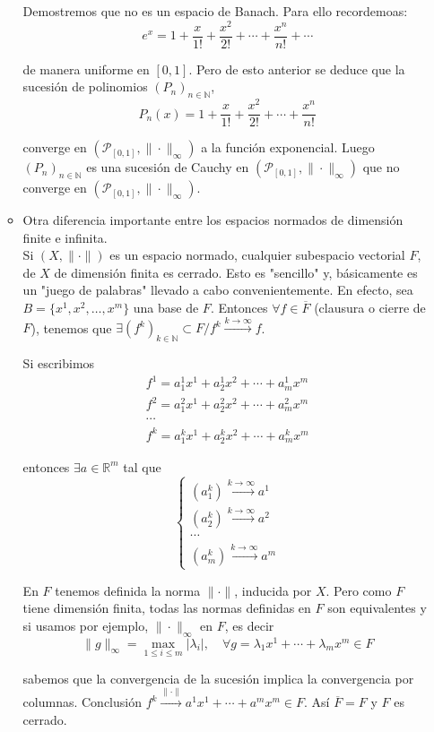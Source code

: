 \documentclass{article}
\begin{document}
\begin{enumerate}
\begin{itemize}
Demostremos que no es un espacio de Banach. Para ello recordemoas:
\begin{equation*}
e^x=1+\frac{x}{1!}+\frac{x^2}{2!}+\cdots+\frac{x^n}{n!}+\cdots
\end{equation*}

de manera uniforme en $[0,1]$. Pero de esto anterior se deduce que la sucesión de polinomios $(P_n)_{n\in\mathbb{N}}$,
\begin{equation*}
P_n(x)=1+\frac{x}{1!}+\frac{x^2}{2!}+\cdots+\frac{x^n}{n!}
\end{equation*}

converge en $(\mathcal{P}_{[0,1]},\|\cdot\|_\infty)$ a la función exponencial. Luego $(P_n)_{n\in\mathbb{N}}$ es una sucesión de Cauchy en $(\mathcal{P}_{[0,1]},\|\cdot\|_\infty)$ que no converge en $(\mathcal{P}_{[0,1]},\|\cdot\|_\infty)$.

\item Otra diferencia importante entre los espacios normados de dimensión finite e infinita.\\

Si $(X,\|\cdot\|)$ es un espacio normado, cualquier subespacio vectorial $F$, de $X$ de dimensión finita es cerrado. Esto es "sencillo" y, básicamente es un "juego de palabras" llevado a cabo convenientemente. En efecto, sea $B=\{x^1,x^2,\ldots,x^m\}$ una base de $F$. Entonces $\forall f\in \overline{F}$ (clausura o cierre de $F$), tenemos que $\exists (f^k)_{k\in\mathbb{N}}\subset F/f^k\xrightarrow{k\to\infty}f$.

Si escribimos
\begin{gather*}
f^1=a_1^1x^1+a_2^1x^2+\cdots+a^1_mx^m\\
f^2=a_1^2x^1+a_2^2x^2+\cdots+a^2_mx^m\\
\cdots\\
f^k=a_1^kx^1+a_2^kx^2+\cdots +a_m^kx^m
\end{gather*}

entonces $\exists a\in \mathbb{R}^m$ tal que
\begin{equation*}
\left\lbrace\begin{array}{c}
(a_1^k)\xrightarrow{k\to\infty} a^1\\
(a_2^k)\xrightarrow{k\to\infty} a^2\\
\cdots\\
(a^k_m)\xrightarrow{k\to\infty}a^m
\end{array}\right.
\end{equation*}

En $F$ tenemos definida la norma $\|\cdot\|$, inducida por $X$. Pero como $F$ tiene dimensión finita, todas las normas definidas en $F$ son equivalentes y si usamos por ejemplo, $\|\cdot\|_\infty$ en $F$, es decir
\begin{equation*}
\|g\|_{\infty}=\max_{1\leq i\leq m}|\lambda_i|,\quad \forall g=\lambda_1x^1+\cdots+\lambda_m x^m\in F
\end{equation*}

sabemos que la convergencia de la sucesión implica la convergencia por columnas. Conclusión $f^k\xrightarrow{\|\cdot\|}a^1x^1+\cdots+a^mx^m\in F$. Así $\overline{F}=F$ y $F$ es cerrado.
\end{itemize}
\end{enumerate}
\end{document}
